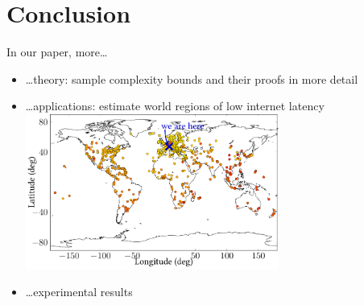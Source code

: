 \documentclass[10pt,mathserif]{beamer}
\begin{document}
\section{Conclusion}

\begin{frame}
\begin{center}
\large In our paper, more\ldots
\end{center}
\begin{itemize}
\item<2-> \ldots theory: sample complexity bounds and their proofs in more detail
\item<3-> \ldots applications: estimate world regions of low internet latency\\[0.5em]
\hspace{3em}\includegraphics[height=2in]{figures/map}
\item<4-> \ldots experimental results
\end{itemize}
\end{frame}
\end{document}
